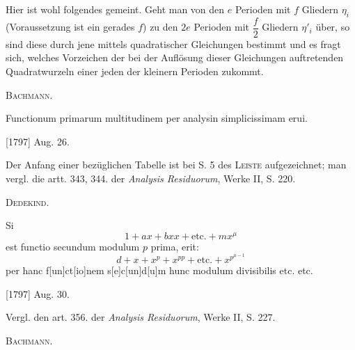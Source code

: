 \medskip\begingroup\small
\indent Hier ist wohl folgendes gemeint. Geht man von den \(e\) Perioden mit \(f\) Gliedern \(\eta_i\) (Voraussetzung ist ein gerades \(f\)) zu den \(2e\) Perioden mit \(\dfrac f2\) Gliedern \(\eta'_i\) über, so sind diese durch jene mittels quadratischer Gleichungen bestimmt und es fragt sich, welches Vorzeichen der bei der Auflösung dieser Gleichungen auftretenden Quadratwurzeln einer jeden der kleinern Perioden zukommt.
\par\noindent\hfill\textsc{Bachmann.}
\par\endgroup

\indent Functionum primarum multitudinem per analysin simplicissimam erui.
\par\noindent\hfill[1797] Aug. 26.

\medskip\begingroup\small
\indent Der Anfang einer bezüglichen Tabelle ist bei S. 5 des \textsc{Leiste} aufgezeichnet; man vergl. die artt. 343, 344. der \textit{Analysis Residuorum}, Werke II, S. 220.
\par\noindent\hfill\textsc{Dedekind.}
\par\endgroup

\indent {} Si
\[
1+ax+bxx+\text{etc.}+mx^\mu
\]
\noindent est functio secundum modulum \(p\) prima, erit:
\[
d+x+x^p+x^{pp}+\text{etc.}+x^{p^{\mu-1}}
\]
\noindent per hanc f[un]ct[io]nem s[e]c[un]d[u]m hunc modulum divisibilis etc. etc.
\par\noindent\hfill[1797] Aug. 30.

\medskip\begingroup\small
\indent Vergl. den art. 356. der \textit{Analysis Residuorum}, Werke II, S. 227.
\par\noindent\hfill\textsc{Bachmann.}
\par\endgroup
